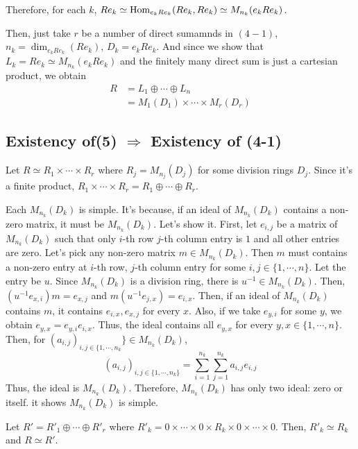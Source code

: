 Therefore, for each \(k\),
\(Re_k \simeq \textnormal{Hom}_{e_k R e_k}(Re_k, Re_k) \simeq M_{n_k}(e_k R e_k)\).

Then, just take \(r\) be a number of direct sumamnds in \((4-1)\),
\(n_k = \dim_{e_k R e_k}(Re_k)\),
\(D_k = e_k R e_k\).
And since we show that \(L_k = Re_k \simeq M_{n_k}(e_k R e_k)\)
and the finitely many direct sum is just a cartesian product,
we obtain
\begin{align*}
  R &= L_1 \oplus \cdots \oplus L_n
  \\&= M_1(D_1) \times \cdots \times M_r(D_r)
\end{align*}
\qedsq

\subsection*{Existency of(5) \(\Rightarrow\) Existency of (4-1)}

Let \(R \simeq R_1 \times \cdots \times R_r\)
where \(R_j = M_{n_j}(D_j)\) for some division rings \(D_j\).
Since it's a finite product,
\(R_1 \times \cdots \times R_r = R_1 \oplus \cdots \oplus R_r\).

Each \(M_{n_k}(D_k)\) is simple.
It's because,
if an ideal of \(M_{n_k}(D_k)\) contains a non-zero matrix,
it must be \(M_{n_k}(D_k)\).
Let's show it.
First, let \(e_{i,j}\) be a matrix of \(M_{n_k}(D_k)\)
such that only \(i\)-th row \(j\)-th column entry is \(1\)
and all other entries are zero.
Let's pick any non-zero matrix \(m \in M_{n_k}(D_k)\).
Then \(m\) must contains a non-zero entry
at \(i\)-th row, \(j\)-th column entry for some \(i, j \in \{1, \cdots, n\}\).
Let the entry be \(u\).
Since \(M_{n_k}(D_k)\) is a division ring,
there is \(u^{-1} \in M_{n_k}(D_k)\).
Then,
\((u^{-1}e_{x, i}) m  = e_{x, j}\)
and
\(m (u^{-1}e_{j, x})  = e_{i, x}\).
Then, if an ideal of \(M_{n_k}(D_k)\) contains \(m\),
it contains \(e_{i, x}, e_{x, j}\) for every \(x\).
Also, if we take \(e_{y, i}\) for some \(y\),
we obtain \(e_{y, x} = e_{y, i} e_{i, x}\).
Thus, the ideal contains all \(e_{y,x}\) for every \(y,x \in \{1, \cdots, n\}\).
Then, for \((a_{i,j})_{i,j \in \{1, \cdots, n_k}\} \in M_{n_k}(D_k)\),
\[(a_{i,j})_{i,j \in  \{1, \cdots, n_k\}} = \sum_{i=1}^{n_k} \sum_{j=1}^{n_k} a_{i,j} e_{i,j}\]
Thus, the ideal is \(M_{n_k}(D_k)\).
Therefore, \(M_{n_k}(D_k)\) has only two ideal: zero or itself.
it shows \(M_{n_k}(D_k)\) is simple.

Let \(R' = R'_1 \oplus \cdots \oplus R'_r\)
where \(R'_k = 0 \times \cdots \times 0 \times R_k \times 0 \times \cdots \times 0\).
Then, \(R'_k \simeq R_k\)
and \(R \simeq R'\).


